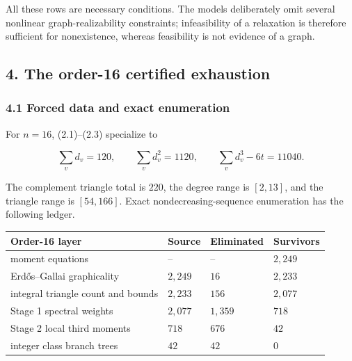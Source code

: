 \documentclass[
  english,
  11pt,
  a4paper,
]{article}
\newcounter{none} %
\begin{document}
All these rows are necessary conditions. The models deliberately omit
several nonlinear graph-realizability constraints; infeasibility of a
relaxation is therefore sufficient for nonexistence, whereas feasibility
is not evidence of a graph.

\subsection{4. The order-16 certified
exhaustion}\label{the-order-16-certified-exhaustion}

\subsubsection{4.1 Forced data and exact
enumeration}\label{forced-data-and-exact-enumeration}

For \(n=16\), (2.1)--(2.3) specialize to

\[
\sum_vd_v=120,
\qquad
\sum_vd_v^2=1120,
\qquad
\sum_vd_v^3-6t=11040.
\tag{4.1}
\]

The complement triangle total is \(220\), the degree range is
\([2,13]\), and the triangle range is \([54,166]\). Exact
nondecreasing-sequence enumeration has the following ledger.

{\def\LTcaptype{none} %
\begin{longtable}[]{@{}
  >{\raggedright\arraybackslash}p{}
  >{\raggedleft\arraybackslash}p{}
  >{\raggedleft\arraybackslash}p{}
  >{\raggedleft\arraybackslash}p{}@{}}
\toprule\noalign{}
\begin{minipage}[b]{\linewidth}\raggedright
Order-16 layer
\end{minipage} & \begin{minipage}[b]{\linewidth}\raggedleft
Source
\end{minipage} & \begin{minipage}[b]{\linewidth}\raggedleft
Eliminated
\end{minipage} & \begin{minipage}[b]{\linewidth}\raggedleft
Survivors
\end{minipage} \\
\midrule\noalign{}
\endhead
\bottomrule\noalign{}
\endlastfoot
moment equations & -- & -- & \(2{,}249\) \\
Erdős--Gallai graphicality & \(2{,}249\) & \(16\) & \(2{,}233\) \\
integral triangle count and bounds & \(2{,}233\) & \(156\) &
\(2{,}077\) \\
Stage 1 spectral weights & \(2{,}077\) & \(1{,}359\) & \(718\) \\
Stage 2 local third moments & \(718\) & \(676\) & \(42\) \\
integer class branch trees & \(42\) & \(42\) & \(0\) \\
\end{longtable}
}
\end{document}
